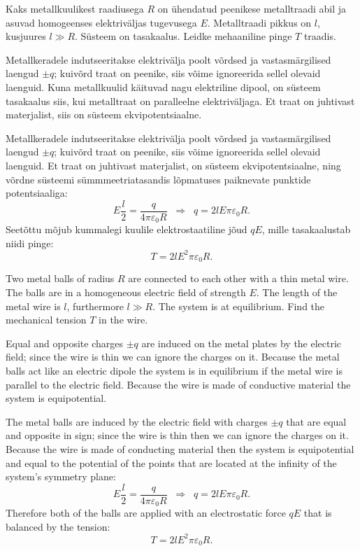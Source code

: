 
Kaks metallkuulikest raadiusega $R$ on ühendatud peenikese metalltraadi abil ja asuvad homogeenses 
elektriväljas tugevusega $E$. Metalltraadi pikkus on $l$, kusjuures $l\gg R$. 
Süsteem on tasakaalus. Leidke mehaaniline pinge $T$ traadis.

\hint
Metallkeradele indutseeritakse elektrivälja poolt võrdsed ja vastasmärgilised laengud $\pm q$; kuivõrd traat on peenike,
siis võime ignoreerida sellel olevaid laenguid. Kuna metallkuulid käituvad nagu elektriline dipool, on süsteem tasakaalus siis, kui metalltraat on paralleelne elektriväljaga. Et traat on juhtivast materjalist, siis on süsteem ekvipotentsiaalne.

\solu
Metallkeradele indutseeritakse elektrivälja poolt võrdsed ja vastasmärgilised laengud $\pm q$; kuivõrd traat on peenike,
siis võime ignoreerida sellel olevaid laenguid. Et traat on juhtivast materjalist, on süsteem ekvipotentsiaalne,
ning võrdne süsteemi sümmmeetriatasandis lõpmatuses paiknevate punktide potentsiaaliga:
$$E\frac l2=\frac q{4\pi\varepsilon_0R}\;\;\Rightarrow\;\; q=2lE\pi\varepsilon_0R.$$
Seetõttu mõjub kummalegi kuulile elektrostaatiline jõud $qE$, mille tasakaalustab niidi pinge:
$$T=2lE^2\pi\varepsilon_0R.$$

Two metal balls of radius $R$ are connected to each other with a thin metal wire. The balls are in a homogeneous electric field of strength $E$. The length of the metal wire is $l$, furthermore $l\gg R$. The system is at equilibrium. Find the mechanical tension $T$ in the wire.

\hinteng
Equal and opposite charges $\pm q$ are induced on the metal plates by the electric field; since the wire is thin we can ignore the charges on it. Because the metal balls act like an electric dipole the system is in equilibrium if the metal wire is parallel to the electric field. Because the wire is made of conductive material the system is equipotential.

\solueng
The metal balls are induced by the electric field with charges $\pm q$ that are equal and opposite in sign; since the wire is thin then we can ignore the charges on it. Because the wire is made of conducting material then the system is equipotential and equal to the potential of the points that are located at the infinity of the system’s symmetry plane:
$$E\frac l2=\frac q{4\pi\varepsilon_0R}\;\;\Rightarrow\;\; q=2lE\pi\varepsilon_0R.$$ 
Therefore both of the balls are applied with an electrostatic force $qE$ that is balanced by the tension:
$$T=2lE^2\pi\varepsilon_0R.$$
\probend